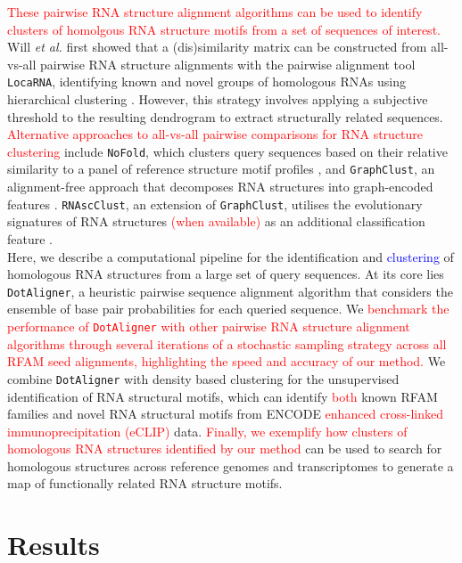 \documentclass{bmcart}
\newcommand\dotaligner{\texttt{DotAligner}}
\newcommand\graphclust{\texttt{GraphClust}}
\newcommand\locarna{\texttt{LocaRNA}}
\begin{document}
\textcolor{red}{These pairwise RNA structure alignment algorithms can be used to identify 
clusters of homolgous RNA structure motifs from a set of sequences of interest.} 
Will \textit{et al.} \nocite{Will17432929} first showed that a (dis)similarity matrix can be 
constructed from all-vs-all pairwise RNA structure alignments with the pairwise alignment 
tool \locarna{}, identifying known and novel groups of homologous RNAs using hierarchical 
clustering \cite{Will17432929}. However, this strategy involves applying a subjective threshold 
to the resulting dendrogram to extract structurally related sequences. \textcolor{red}{Alternative 
approaches to all-vs-all pairwise comparisons for RNA structure clustering } include \texttt{NoFold},
which clusters query sequences based on their relative similarity 
to a panel of reference structure motif profiles \cite{Middleton25234928}, and \graphclust{}, 
an alignment-free approach that decomposes RNA structures into graph-encoded features 
\cite{Heyne22689765}. \texttt{RNAscClust}, an extension of \graphclust{}, utilises the 
evolutionary signatures of RNA structures  \textcolor{red}{(when available) }as an additional classification feature \cite{Miladi28334186}. \\

Here, we describe a computational pipeline for the identification and \textcolor{blue}{clustering} of
homologous RNA structures from a large set of query sequences. At its core lies \dotaligner{}, a
heuristic pairwise sequence alignment algorithm that considers the ensemble of 
base pair probabilities for each queried sequence. 
We \textcolor{red}{ benchmark the performance of \dotaligner{} with other pairwise 
RNA structure alignment algorithms through several iterations of a stochastic sampling 
strategy across all RFAM seed alignments, highlighting the speed and accuracy of our method.}  
We combine \dotaligner{} with density based clustering for the unsupervised identification of 
RNA structural motifs, which can identify \textcolor{red}{both} known RFAM families and novel RNA structural 
motifs from ENCODE \textcolor{red}{enhanced cross-linked immunoprecipitation (eCLIP)}  data. 
\textcolor{red}{Finally, we exemplify how clusters of homologous RNA structures identified 
by our method} can be used to search for homologous structures across reference genomes 
and transcriptomes to generate a map of functionally related RNA structure motifs.  

\section*{Results}
\end{document}
